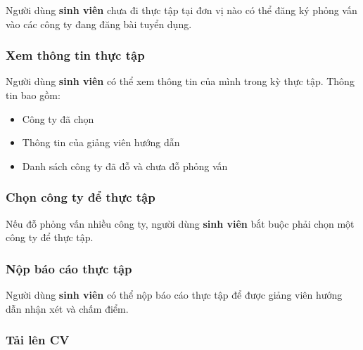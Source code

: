 \documentclass[./../main.tex]{subfiles}
\begin{document}
Người dùng \textbf{sinh viên} chưa đi thực tập tại đơn vị nào có thể
đăng ký phỏng vấn vào các công ty đang đăng bài tuyển dụng.
  
\hypertarget{xem-thuxf4ng-tin-thux1ef1c-tux1eadp}{%
	\subsubsection{Xem thông tin thực
		tập}\label{xem-thuxf4ng-tin-thux1ef1c-tux1eadp}}
  
Người dùng \textbf{sinh viên} có thể xem thông tin của mình trong kỳ
thực tập. Thông tin bao gồm:
  
\begin{itemize}
	\item
	      
	      	Công ty đã chọn
	      
	\item
	      
	      	Thông tin của giảng viên hướng dẫn
	      
	\item
	      
	      	Danh sách công ty đã đỗ và chưa đỗ phỏng vấn
	      
\end{itemize}
  
\hypertarget{chux1ecdn-cuxf4ng-ty-ux111ux1ec3-thux1ef1c-tux1eadp}{%
	\subsubsection{Chọn công ty để thực
		tập}\label{chux1ecdn-cuxf4ng-ty-ux111ux1ec3-thux1ef1c-tux1eadp}}
  
Nếu đỗ phỏng vấn nhiều công ty, người dùng \textbf{sinh viên} bắt buộc
phải chọn một công ty để thực tập.
  
\hypertarget{nux1ed9p-buxe1o-cuxe1o-thux1ef1c-tux1eadp}{%
	\subsubsection{Nộp báo cáo thực
		tập}\label{nux1ed9p-buxe1o-cuxe1o-thux1ef1c-tux1eadp}}
  
Người dùng \textbf{sinh viên} có thể nộp báo cáo thực tập để được giảng
viên hướng dẫn nhận xét và chấm điểm.
  
\hypertarget{tux1ea3i-luxean-cv}{%
	\subsubsection{Tải lên CV}\label{tux1ea3i-luxean-cv}}
  
\end{document}
